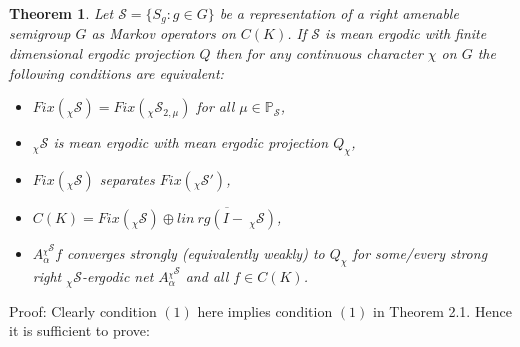 \documentclass{amsart}
\newtheorem{thm}{Theorem}[section]
\theoremstyle{definition}
\theoremstyle{remark}
\numberwithin{equation}{section}
\begin{document}
\begin{thm} Let $\mathcal{S} = \{ S_g : g\in G \}$ be a representation of a right amenable semigroup $G$ as Markov operators on $C(K)$. If $\mathcal{S}$ is mean ergodic with finite dimensional ergodic projection $Q$ then for any continuous character $\chi $ on $G$ the following conditions are equivalent:
\begin{itemize}
\item[(1)] $Fix(_{\chi}\mathcal{S}) = Fix(_{\chi}\mathcal{S}_{2,\mu})$ for all $\mu \in \mathbb{P}_{\mathcal{S}}$,
\item[(2)] $_{\chi}\mathcal{S}$ is mean ergodic with mean ergodic projection $Q_{\chi}$,
\item[(3)] $Fix(\mathcal{_{\chi}S})$ separates $Fix(_{\chi}\mathcal{S}')$,
\item[(4)] $C(K) = Fix(_{\chi}\mathcal{S})\oplus \overline{lin\ rg(I - \  _{\chi}\mathcal{S})} $,
\item[(5)] $A_{\alpha}^{_{\chi}\mathcal{S}}f$ converges strongly (equivalently weakly) to $Q_{\chi }$ for some/every strong right $_{\chi}\mathcal{S}$-ergodic net $A_{\alpha}^{_{\chi}\mathcal{S}}$ and all $f\in C(K)$.
\end{itemize}
\end{thm}

Proof: Clearly condition $(1)$ here implies condition $(1)$ in Theorem 2.1. Hence it is sufficient to prove:
\end{document}
